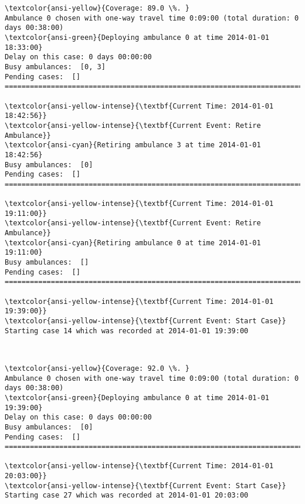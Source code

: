 \documentclass[11pt]{article}
\begin{document}
    \begin{Verbatim}[commandchars=\\\{\}]
\textcolor{ansi-yellow}{Coverage: 89.0 \%. }
Ambulance 0 chosen with one-way travel time 0:09:00 (total duration: 0 days 00:38:00)
\textcolor{ansi-green}{Deploying ambulance 0 at time 2014-01-01 18:33:00}
Delay on this case: 0 days 00:00:00
Busy ambulances:  [0, 3]
Pending cases:  []
========================================================================

\textcolor{ansi-yellow-intense}{\textbf{Current Time: 2014-01-01 18:42:56}}
\textcolor{ansi-yellow-intense}{\textbf{Current Event: Retire Ambulance}}
\textcolor{ansi-cyan}{Retiring ambulance 3 at time 2014-01-01 18:42:56}
Busy ambulances:  [0]
Pending cases:  []
========================================================================

\textcolor{ansi-yellow-intense}{\textbf{Current Time: 2014-01-01 19:11:00}}
\textcolor{ansi-yellow-intense}{\textbf{Current Event: Retire Ambulance}}
\textcolor{ansi-cyan}{Retiring ambulance 0 at time 2014-01-01 19:11:00}
Busy ambulances:  []
Pending cases:  []
========================================================================

\textcolor{ansi-yellow-intense}{\textbf{Current Time: 2014-01-01 19:39:00}}
\textcolor{ansi-yellow-intense}{\textbf{Current Event: Start Case}}
Starting case 14 which was recorded at 2014-01-01 19:39:00

    \end{Verbatim}

    \begin{center}
    \end{center}
    { \hspace*{\fill} \\}
    
    \begin{Verbatim}[commandchars=\\\{\}]
\textcolor{ansi-yellow}{Coverage: 92.0 \%. }
Ambulance 0 chosen with one-way travel time 0:09:00 (total duration: 0 days 00:38:00)
\textcolor{ansi-green}{Deploying ambulance 0 at time 2014-01-01 19:39:00}
Delay on this case: 0 days 00:00:00
Busy ambulances:  [0]
Pending cases:  []
========================================================================

\textcolor{ansi-yellow-intense}{\textbf{Current Time: 2014-01-01 20:03:00}}
\textcolor{ansi-yellow-intense}{\textbf{Current Event: Start Case}}
Starting case 27 which was recorded at 2014-01-01 20:03:00

    \end{Verbatim}
\end{document}
